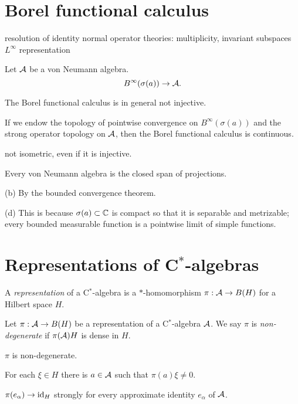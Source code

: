\documentclass{../note}
\begin{document}
\begin{prb}
\end{prb}




\section{Borel functional calculus}
resolution of identity
normal operator theories: multiplicity, invariant subspaces
$L^\infty$ representation

\begin{prb}
Let $\mathcal{A}$ be a von Neumann algebra.
\[B^\infty(\sigma(a))\to\mathcal{A}.\]
\begin{parts}
\item The Borel functional calculus is in general not injective.
\item If we endow the topology of pointwise convergence on $B^\infty(\sigma(a))$ and the strong operator topology on $\mathcal{A}$, then the Borel functional calculus is continuous.
\item not isometric, even if it is injective.
\item Every von Neumann algebra is the closed span of projections.
\end{parts}
\end{prb}
\begin{prb}

(b)
By the bounded convergence theorem.

(d)
This is because $\sigma(a)\subset\mathbb{C}$ is compact so that it is separable and metrizable; every bounded measurable function is a pointwise limit of simple functions.

\end{prb}





\section{Representations of C$^*$-algebras}
\begin{prb}
A \emph{representation} of a C$^*$-algebra is a $*$-homomorphism $\pi:\mathcal{A}\to B(H)$ for a Hilbert space $H$.
\end{prb}

\begin{prb}
Let $\pi:\mathcal{A}\to B(H)$ be a representation of a C$^*$-algebra $\mathcal{A}$.
We say $\pi$ is \emph{non-degenerate} if $\pi(\mathcal{A})H$ is dense in $H$.
\begin{parts}
\item $\pi$ is non-degenerate.
\item For each $\xi\in H$ there is $a\in\mathcal{A}$ such that $\pi(a)\xi\ne0$.
\item $\pi(e_\alpha)\to\operatorname{id}_H$ strongly for every approximate identity $e_\alpha$ of $\mathcal{A}$.
\end{parts}
\end{prb}
\end{document}
